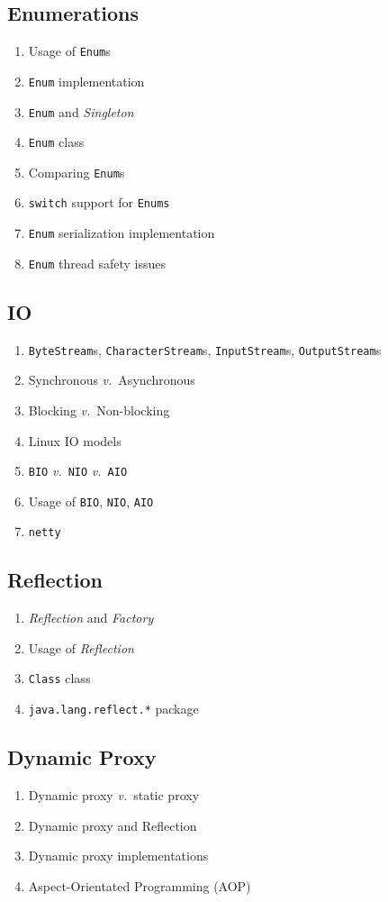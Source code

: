 \documentclass[11pt, twocolumn]{article}
\newcommand{\versus}{\textit{v.}\ }
\begin{document}
\subsection{Enumerations}
\begin{enumerate}
	\item Usage of \texttt{Enum}s
	\item \texttt{Enum} implementation
	\item \texttt{Enum} and \textit{Singleton}
	\item \texttt{Enum} class
	\item Comparing \texttt{Enum}s
	\item \texttt{switch} support for \texttt{Enums}
	\item \texttt{Enum} serialization implementation
	\item \texttt{Enum} thread safety issues
\end{enumerate}

\subsection{IO}
\begin{enumerate}
	\item \texttt{ByteStream}s, \texttt{CharacterStream}s, \texttt{InputStream}s, \texttt{OutputStream}s
	\item Synchronous \versus Asynchronous
	\item Blocking \versus Non-blocking
	\item Linux IO models
	\item \texttt{BIO} \versus \texttt{NIO} \versus \texttt{AIO}
	\item Usage of \texttt{BIO}, \texttt{NIO}, \texttt{AIO}
	\item \texttt{netty}
\end{enumerate}

\subsection{Reflection}
\begin{enumerate}
	\item \textit{Reflection} and \textit{Factory}
	\item Usage of \textit{Reflection}
	\item \texttt{Class} class
	\item \texttt{java.lang.reflect.*} package
\end{enumerate}

\subsection{Dynamic Proxy}
\begin{enumerate}
	\item Dynamic proxy \versus	static proxy
	\item Dynamic proxy and Reflection
	\item Dynamic proxy implementations
	\item Aspect-Orientated Programming (AOP)
\end{enumerate}
\end{document}
